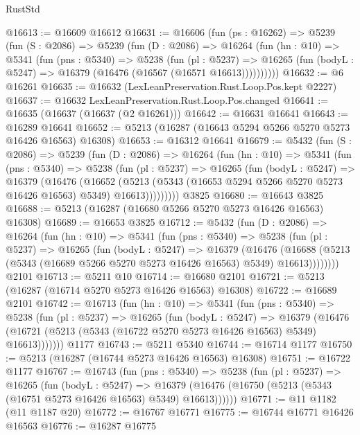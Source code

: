 \begin{lexlean}{RustStd}
\begin{coremodule}
@16613 := @16609 @16612
@16631 := @16606
    (fun (ps : @16262) =>
    @5239
      (fun (S : @2086) =>
      @5239
        (fun (D : @2086) =>
        @16264
          (fun (hn : @10) =>
          @5341
            (fun (pns : @5340) =>
            @5238
              (fun (pl : @5237) =>
              @16265 (fun (bodyL : @5247) => @16379 (@16476 (@16567 (@16571 @16613))))))))))
@16632 := @6 @16261
@16635 := @16632 (LexLeanPreservation.Rust.Loop.Pos.kept @2227)
@16637 := @16632 LexLeanPreservation.Rust.Loop.Pos.changed
@16641 := @16635 (@16637 (@16637 (@2 @16261)))
@16642 := @16631 @16641
@16643 := @16289 @16641
@16652 := @5213 (@16287 (@16643 @5294 @5266 @5270 @5273 @16426 @16563) @16308)
@16653 := @16312 @16641
@16679 := @5432
    (fun (S : @2086) =>
    @5239
      (fun (D : @2086) =>
      @16264
        (fun (hn : @10) =>
        @5341
          (fun (pns : @5340) =>
          @5238
            (fun (pl : @5237) =>
            @16265
              (fun (bodyL : @5247) =>
              @16379
                (@16476
                  (@16652
                    (@5213
                      (@5343 (@16653 @5294 @5266 @5270 @5273 @16426 @16563) @5349)
                      @16613)))))))))
    @3825
@16680 := @16643 @3825
@16688 := @5213 (@16287 (@16680 @5266 @5270 @5273 @16426 @16563) @16308)
@16689 := @16653 @3825
@16712 := @5432
    (fun (D : @2086) =>
    @16264
      (fun (hn : @10) =>
      @5341
        (fun (pns : @5340) =>
        @5238
          (fun (pl : @5237) =>
          @16265
            (fun (bodyL : @5247) =>
            @16379
              (@16476
                (@16688 (@5213 (@5343 (@16689 @5266 @5270 @5273 @16426 @16563) @5349) @16613))))))))
    @2101
@16713 := @5211 @10
@16714 := @16680 @2101
@16721 := @5213 (@16287 (@16714 @5270 @5273 @16426 @16563) @16308)
@16722 := @16689 @2101
@16742 := @16713
    (fun (hn : @10) =>
    @5341
      (fun (pns : @5340) =>
      @5238
        (fun (pl : @5237) =>
        @16265
          (fun (bodyL : @5247) =>
          @16379
            (@16476 (@16721 (@5213 (@5343 (@16722 @5270 @5273 @16426 @16563) @5349) @16613)))))))
    @1177
@16743 := @5211 @5340
@16744 := @16714 @1177
@16750 := @5213 (@16287 (@16744 @5273 @16426 @16563) @16308)
@16751 := @16722 @1177
@16767 := @16743
    (fun (pns : @5340) =>
    @5238
      (fun (pl : @5237) =>
      @16265
        (fun (bodyL : @5247) =>
        @16379 (@16476 (@16750 (@5213 (@5343 (@16751 @5273 @16426 @16563) @5349) @16613))))))
@16771 := @11 @1182 (@11 @1187 @20)
@16772 := @16767 @16771
@16775 := @16744 @16771 @16426 @16563
@16776 := @16287 @16775

\end{coremodule}
\end{lexlean}
